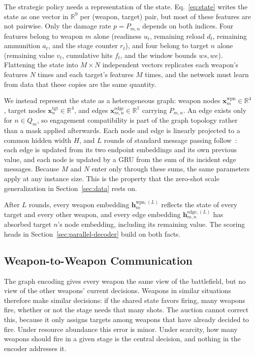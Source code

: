 The strategic policy needs a representation of the state. Eq.~\eqref{eq:state} writes the state as one vector in $\mathbb{R}^9$ per (weapon, target) pair, but most of these features are not pairwise. Only the damage rate $p = P_{m,n}$ depends on both indices. Four features belong to weapon $m$ alone (readiness $u_t$, remaining reload $d_t$, remaining ammunition $a_t$, and the stage counter $r_t$), and four belong to target $n$ alone (remaining value $v_t$, cumulative hits $f_t$, and the window bounds $ws, we$).
Flattening the state into $M \times N$ independent vectors replicates each weapon's features $N$ times and each target's features $M$ times, and the network must learn from data that these copies are the same quantity.

We instead represent the state as a heterogeneous graph: weapon nodes $\bm{x}_m^{\text{wpn}} \in \mathbb{R}^4$, target nodes $\bm{x}_n^{\text{tgt}} \in \mathbb{R}^4$, and edges $\bm{x}_{m,n}^{\text{edge}} \in \mathbb{R}^1$ carrying $P_{m,n}$. An edge exists only for $n \in Q_m$, so engagement compatibility is part of the graph topology rather than a mask applied afterwards. Each node and edge is linearly projected to a common hidden width $H$, and $L$ rounds of standard message passing follow~\cite{gilmer2017neural}: each edge is updated from its two endpoint embeddings and its own previous value, and each node is updated by a GRU from the sum of its incident edge messages. Because $M$ and $N$ enter only through these sums, the same parameters apply at any instance size. This is the property that the zero-shot scale generalization in Section~\ref{sec:data} rests on.

After $L$ rounds, every weapon embedding $\bm{h}_m^{\text{wpn},(L)}$ reflects the state of every target and every other weapon, and every edge embedding $\bm{h}_{m,n}^{\text{edge},(L)}$ has absorbed target $n$'s node embedding, including its remaining value. The scoring heads in Section~\ref{sec:parallel-decoder} build on both facts.

\subsection{Weapon-to-Weapon Communication}
\label{sec:comm}

The graph encoding gives every weapon the same view of the battlefield, but no view of the other weapons' current decisions. Weapons in similar situations therefore make similar decisions: if the shared state favors firing, many weapons fire, whether or not the stage needs that many shots. The auction cannot correct this, because it only assigns targets among weapons that have already decided to fire. Under resource abundance this error is minor. Under scarcity, how many weapons should fire in a given stage is the central decision, and nothing in the encoder addresses it.

